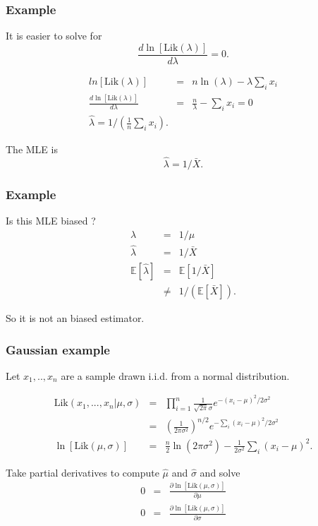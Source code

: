 \begin{frame}[fragile]\frametitle{Example}
It is easier to solve for 
$$ \frac{d \ln[\mbox{Lik}(\lambda)]}{d \lambda } = 0.$$

\begin{eqnarray*}
ln[\mbox{Lik}(\lambda)] & =& n \ln(\lambda) - \lambda \sum_i x_i  \\  
\frac{d\ln[\mbox{Lik}(\lambda)]}{d \lambda}& =&  \frac{n}{\lambda} -\sum_i x_i = 0 \\ 
\hat{\lambda} = 1/\left(\frac{1}{n} \sum_i x_i\right). 
\end{eqnarray*}

The MLE is
$$\hat{\lambda} = 1/\bar{X}.$$
\end{frame}


\begin{frame}[fragile]\frametitle{Example}

Is this MLE biased ? 
\begin{eqnarray*}
\lambda &= & 1/\mu \\ 
\hat{\lambda} &=& 1/\bar{X} \\ 
\mathbb E[\hat{\lambda}] & = & \mathbb E[1 / \bar{X}] \\
 & \neq & 1/\left(\mathbb E[\bar{X}]\right).  
\end{eqnarray*}

So it is not an biased estimator.

\end{frame}


\begin{frame}[fragile]\frametitle{Gaussian example}
{\tiny

Let $x_1,..,x_n$ are a sample drawn i.i.d. from a normal distribution.

\begin{eqnarray*}
\mbox{Lik}(x_1,...,x_n|\mu,\sigma) & =&  \prod_{i=1}^n \frac{1}{\sqrt{2 \pi} \sigma }  e^{-(x_i-\mu)^2/2 \sigma^2} \\ 
 & =&  \left(\frac{1}{2 \pi \sigma^2} \right)^{n/2} e^{-\sum_i(x_i-\mu)^2/2 \sigma^2} \\ 
\ln[\mbox{Lik}(\mu,\sigma)] &=& \frac{n}{2} \ln(2 \pi \sigma^2) - \frac{1}{2 \sigma^2} \sum_i (x_i - \mu )^2. 
\end{eqnarray*}

Take partial derivatives to compute $\hat{\mu}$ and $\hat{\sigma}$
and solve
\begin{eqnarray*}
0 & =& \frac{\partial \ln[\mbox{Lik}(\mu,\sigma)]}{\partial \mu} \\
0 & =& \frac{\partial \ln[\mbox{Lik}(\mu,\sigma)]}{\partial \sigma} 
\end{eqnarray*}



}
\end{frame}


